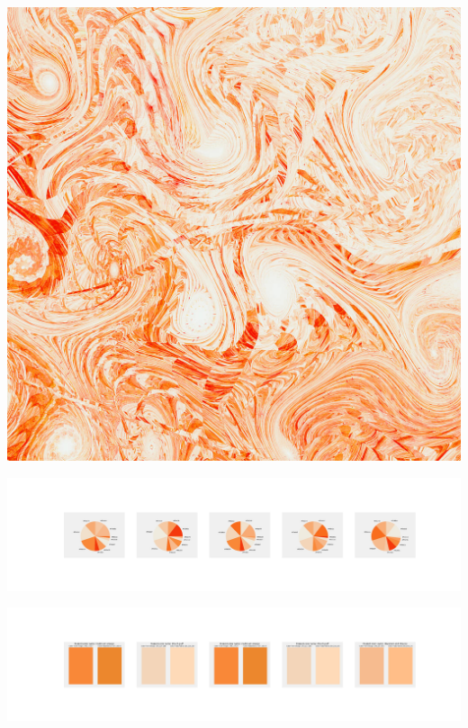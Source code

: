 \documentclass[11pt]{article}
\begin{document}
\begin{landscape}
    \begin{center}
    \includegraphics[width=\textwidth]{./nbimg/file (420).jpg}
    \end{center}

    \begin{center}
    \includegraphics[width=250mm]{./nbimg/pie-357.jpg}
    \end{center}

    \begin{center}
    \includegraphics[width=250mm]{./nbimg/peak-357.jpg}
    \end{center}
    


\end{landscape}
\end{document}
